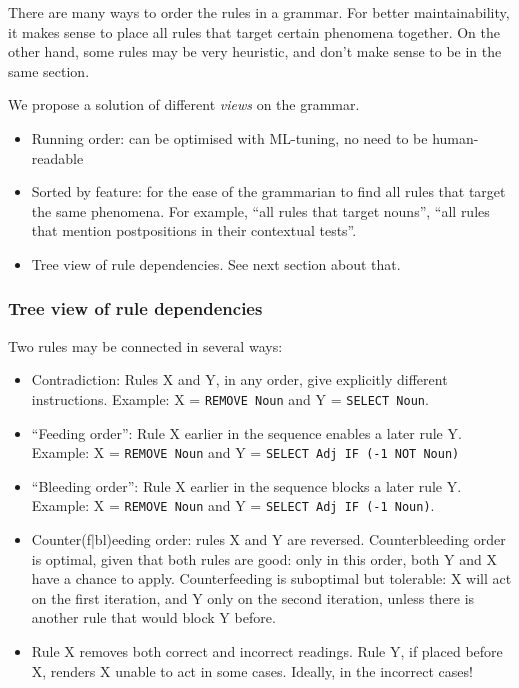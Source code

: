 \documentclass[11pt]{article}
\def\t#1{\texttt{#1}}
\begin{document}
There are many ways to order the rules in a grammar. For better maintainability, 
it makes sense to place all rules that target certain phenomena together.
On the other hand, some rules may be very heuristic, and don't make sense to be in the same section.

We propose a solution of different \emph{views} on the grammar.
\begin{itemize}
\item Running order: can be optimised with ML-tuning, no need to be human-readable
\item Sorted by feature: for the ease of the grammarian to find all rules that target the same phenomena.
For example, ``all rules that target nouns'', ``all rules that mention postpositions in their contextual tests''.
\item Tree view of rule dependencies. See next section about that.
\end{itemize}



\subsubsection{Tree view of rule dependencies}

Two rules may be connected in several ways:

\begin{itemize}
\item Contradiction: Rules X and Y, in any order, give explicitly different instructions. Example: X = \t{REMOVE Noun} and Y = \t{SELECT Noun}.
\item ``Feeding order'': Rule X earlier in the sequence enables a later rule Y. Example: X = \t{REMOVE Noun} and Y = \t{SELECT Adj IF (-1 NOT Noun)}
\item ``Bleeding order'': Rule X earlier in the sequence blocks a later rule Y. Example:  X = \t{REMOVE Noun} and Y = \t{SELECT Adj IF (-1 Noun)}.
\item Counter(f|bl)eeding order: rules X and Y are reversed. Counterbleeding order is optimal, given that both rules are good: only in this order, both Y and X have a chance to apply. Counterfeeding is suboptimal but tolerable: X will act on the first iteration, and Y only on the second iteration, unless there is another rule that would block Y before.
\item Rule X removes both correct and incorrect readings. Rule Y, if placed before X, renders X unable to act in some cases. Ideally, in the incorrect cases!
\end{itemize}
\end{document}
